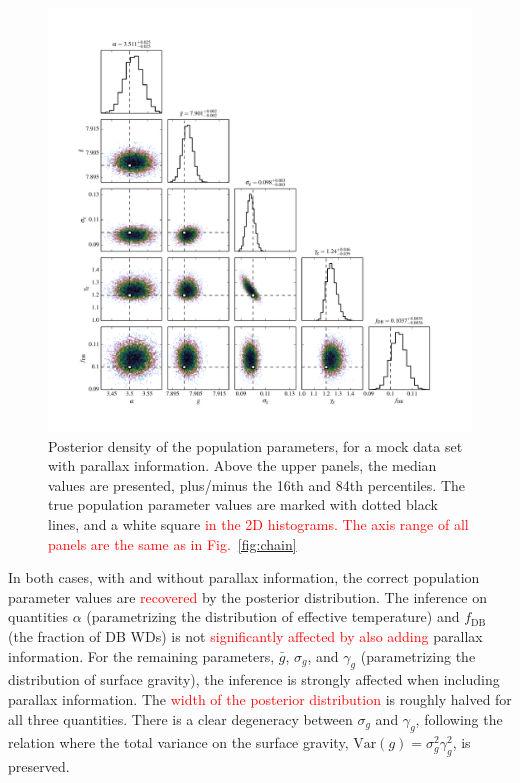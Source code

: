 \documentclass[fleqn,usenatbib]{mnras}
\newcommand{\changes}[1]{\textcolor{red}{#1}}
\newcommand{\logg}{g}
\begin{document}
\begin{figure}
	\includegraphics[width=1.\textwidth]{toy_chain_include-parallax.pdf}
    \caption{ Posterior density of the population parameters, for a mock data set with parallax information. Above the upper panels, the median values are presented, plus/minus the 16th and 84th percentiles. The true population parameter values are marked with dotted black lines, and a white square \changes{in the 2D histograms. The axis range of all panels are the same as in Fig.~\ref{fig:chain}}}
    \label{fig:chain_parallax}
\end{figure}

In both cases, with and without parallax information, the correct population parameter values are \changes{recovered} by the posterior distribution. The inference on quantities $\alpha$ (parametrizing the distribution of effective temperature) and $f_\text{DB}$ (the fraction of DB WDs) is not \changes{significantly affected by also adding} parallax information. For the remaining parameters, $\bar{g}$, $\sigma_g$, and $\gamma_g$ (parametrizing the distribution of surface gravity), the inference is strongly affected when including parallax information. The \changes{width of the posterior distribution} is roughly halved for all three quantities. There is a clear degeneracy between $\sigma_g$ and $\gamma_g$, following the relation where the total variance on the surface gravity, $\text{Var}(\logg) = \sigma_g^2\gamma_g^2$, is preserved.
\end{document}
